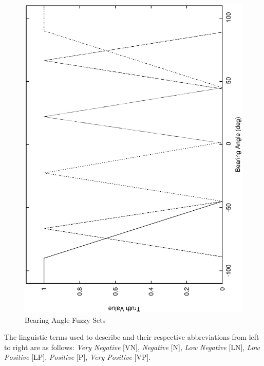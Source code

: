 \documentclass[10pt, conference, compsocconf]{IEEEtran}
\begin{document}
\begin{figure}[h]
\centering
\includegraphics[scale=0.35, angle=-90]{EPS/ba}
\caption{Bearing Angle Fuzzy Sets}
\label{fig:bearingAngle}
\end{figure}
The linguistic terms used to describe and their respective abbreviations from left to right are as follows: {\it Very Negative} [VN], {\it Negative} [N], {\it Low Negative} [LN], {\it Low Positive} [LP], {\it Positive} [P], {\it Very Positive} [VP].
\end{document}

